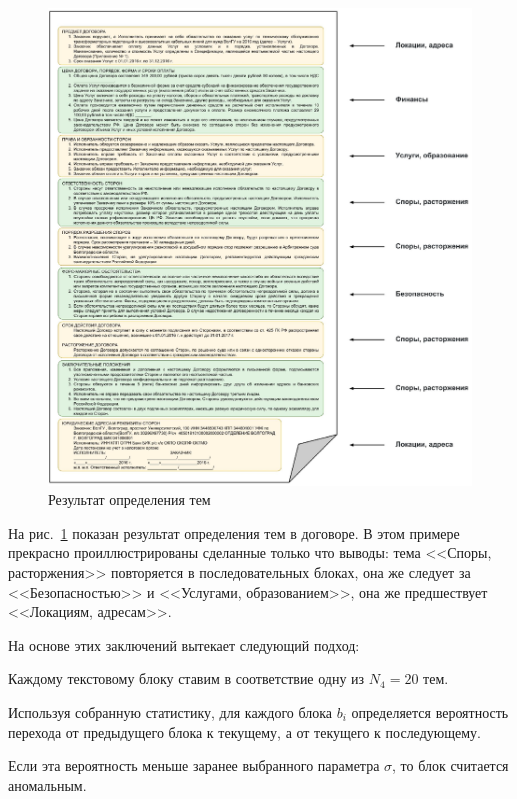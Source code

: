 \documentclass[12pt]{article}
\begin{document}
\begin{center}
	\begin{figure}[h!]
		\centering
		\includegraphics[scale=0.8]{images/im6.eps}
		\caption{Результат определения тем}
		\label{im6}
	\end{figure}
\end{center}

На рис.~\ref{im6} показан результат определения тем в договоре. В этом примере прекрасно проиллюстрированы сделанные только что выводы: тема <<Споры, расторжения>> повторяется в последовательных блоках, она же следует за <<Безопасностью>> и <<Услугами, образованием>>, она же предшествует <<Локациям, адресам>>. 

На основе этих заключений вытекает следующий подход:

\par\begin{itemize}{
		\vspace{-0.2cm}\item Каждому текстовому блоку ставим в соответствие одну из $N_4 = 20$ тем.
		\vspace{-0.2cm}\item Используя собранную статистику, для каждого блока $b_i$ определяется вероятность перехода от предыдущего блока к текущему, а от текущего к последующему.  
		\vspace{-0.2cm}\item Если эта вероятность меньше заранее выбранного параметра $\sigma$, то блок считается аномальным.
}\end{itemize}
\end{document}

